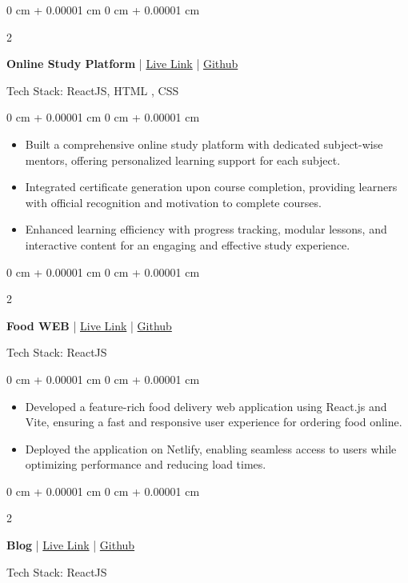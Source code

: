 \documentclass[12pt, a3paper]{article}
\newenvironment{highlights}{
    \begin{itemize}[
        topsep=0.10 cm,
        parsep=0.10 cm,
        partopsep=0pt,
        itemsep=0pt,
        leftmargin=0 cm + 10pt
    ]
}{
    \end{itemize}
} %
\newenvironment{onecolentry}{
    \begin{adjustwidth}{
        0 cm + 0.00001 cm
    }{
        0 cm + 0.00001 cm
    }
}{
    \end{adjustwidth}
} %
\newenvironment{twocolentry}[2][]{
    \onecolentry
    \def\secondColumn{#2}
    \setcolumnwidth{\fill, 4.5 cm}
    \begin{paracol}{2}
}{
    \switchcolumn \raggedleft \secondColumn
    \end{paracol}
    \endonecolentry
} %
\begin{document}
        \vspace{0.7 cm}
        \begin{twocolentry}{
            
            }
                \textbf{Online Study Platform } | \href{https://studyonlineweb.netlify.app/}{Live Link} | \href{https://github.com/trishaamandal/CD-studiesPlans}{Github}\end{twocolentry}
                Tech Stack: ReactJS, HTML , CSS
    
            \vspace{0.10 cm}
            \begin{onecolentry}
                \begin{highlights}
                    \item Built a comprehensive online study platform with dedicated subject-wise mentors, offering personalized learning support for each subject.
                    \item Integrated certificate generation upon course completion, providing learners with official recognition and motivation to complete courses.
                    \item Enhanced learning efficiency with progress tracking, modular lessons, and interactive content for an engaging and effective study experience.
                \end{highlights}
            \end{onecolentry}
            \vspace{0.7 cm}
        \begin{twocolentry}{
        }
            \textbf{Food WEB } | \href{https://trishafood-delivery-app.netlify.app/}{Live Link} | \href{https://github.com/trishaamandal/fooddelivery}{Github}\end{twocolentry}
            Tech Stack: ReactJS

        \vspace{0.10 cm}
        \begin{onecolentry}
            \begin{highlights}
                \item Developed a feature-rich food delivery web application using React.js and Vite, ensuring a fast and responsive user experience for ordering food online.
                \item Deployed the application on Netlify, enabling seamless access to users while optimizing performance and reducing load times.
            \end{highlights}
        \end{onecolentry}
        \vspace{0.7 cm}
        \begin{twocolentry}{
            }
                \textbf{Blog } | \href{https://trishamandal2004.netlify.app/}{Live Link} | \href{https://github.com/trishaamandal/portfoliomain2025}{Github}\end{twocolentry}
                Tech Stack: ReactJS
    
\end{document}
